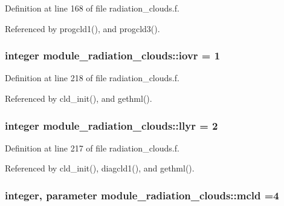 Definition at line 168 of file radiation\+\_\+clouds.\+f.



Referenced by progcld1(), and progcld3().

\subsubsection[{\texorpdfstring{iovr}{iovr}}]{\setlength{\rightskip}{0pt plus 5cm}integer module\+\_\+radiation\+\_\+clouds\+::iovr = 1\hspace{0.3cm}{\ttfamily [private]}}\hypertarget{group__module__radiation__clouds_ga5cfafee79e8cf066ddd8440cdfdc41a0}{}\label{group__module__radiation__clouds_ga5cfafee79e8cf066ddd8440cdfdc41a0}


Definition at line 218 of file radiation\+\_\+clouds.\+f.



Referenced by cld\+\_\+init(), and gethml().

\subsubsection[{\texorpdfstring{llyr}{llyr}}]{\setlength{\rightskip}{0pt plus 5cm}integer module\+\_\+radiation\+\_\+clouds\+::llyr = 2\hspace{0.3cm}{\ttfamily [private]}}\hypertarget{group__module__radiation__clouds_ga3390b20d42afccb3ec569a5b69a93f6e}{}\label{group__module__radiation__clouds_ga3390b20d42afccb3ec569a5b69a93f6e}


Definition at line 217 of file radiation\+\_\+clouds.\+f.



Referenced by cld\+\_\+init(), diagcld1(), and gethml().

\subsubsection[{\texorpdfstring{mcld}{mcld}}]{\setlength{\rightskip}{0pt plus 5cm}integer, parameter module\+\_\+radiation\+\_\+clouds\+::mcld =4\hspace{0.3cm}{\ttfamily [private]}}\hypertarget{group__module__radiation__clouds_gafb94f3d62afa49bef6c33f73a7ecad65}{}\label{group__module__radiation__clouds_gafb94f3d62afa49bef6c33f73a7ecad65}


